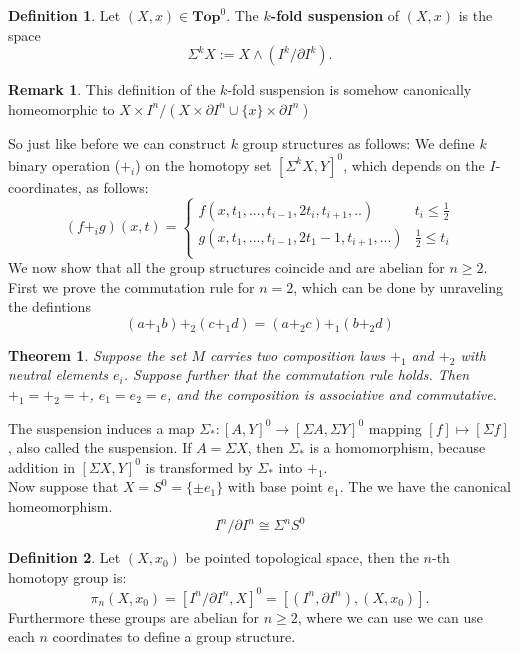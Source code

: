 \documentclass{article}
\newtheorem{theorem}{Theorem}[section]
\theoremstyle{definition}
\newtheorem{remark}{Remark}
\newtheorem{defn}{Definition}[section]
\newcommand{\cat}[1]{\mathbf{#1}}
\begin{document}
  \begin{defn}
   Let $(X,x)\in\cat{Top}^{0}$. The \textbf{$k$-fold suspension} of $(X,x)$ is the space \[\Sigma^k X:=X\wedge  (I^k/\partial I^k).\]
  \end{defn}
  \begin{remark}
  This definition of the $k$-fold suspension is somehow canonically homeomorphic to $X\times I^n/(X\times\partial I^n\cup\{x\}\times \partial I^n)$
  \end{remark}
  So just like before we can construct  $k$ group structures as follows: We define  $k$ binary operation ($+_i$) on the homotopy set $[\Sigma^k X, Y]^0$, which depends on the $I$-coordinates, as follows:$$(f+_i g)(x,t)= \begin{cases} 
      f(x,t_1, ..., t_{i-1},2t_i, t_{i+1},..) & t_i\leq \frac{1}{2} \\
      g(x,t_1, ..., t_{i-1},2t_1-1, t_{i+1},...) & \frac{1}{2}\leq t_i \\
   \end{cases}$$
   We now show that all the group structures coincide and are abelian for $n\geq 2$. First we prove the commutation rule for $n=2$, which can be done by unraveling the defintions $$(a+_1 b)+_2(c+_1 d)=(a+_2 c)+_1(b+_2d)$$
   \begin{theorem}
   Suppose the set $M$ carries two composition laws $+_1$ and $+_2$ with neutral elements $e_i$. Suppose further that the commutation rule holds. Then $+_1=+_2=+$, $e_1=e_2=e$, and the composition is associative and commutative. 
   \end{theorem}
   The suspension induces a map $\Sigma_*:[A,Y]^0 \rightarrow [\Sigma A,\Sigma Y]^0$ mapping $[f]\mapsto [\Sigma f]$, also called the suspension. If $A=\Sigma X$, then $\Sigma _*$ is a homomorphism, because addition in $[\Sigma X, Y]^0$ is transformed by $\Sigma_*$ into $+_1$. \\ Now suppose that $X=S^{0}=\{\pm e_1\}$ with base point $e_1$. The we have the canonical homeomorphism. $$I^{n}/\partial I^{n}\cong \Sigma^n S^0$$
   \begin{defn}
   Let $(X,x_0)$ be pointed topological space, then the $n$-th homotopy group is: $$\pi_n(X,x_0)=[I^n/\partial I^n,X]^0=[(I^n,\partial I^n), (X,x_0)].$$ Furthermore these groups are abelian for $n\geq 2$, where we can use we can use each $n$ coordinates to define a group structure.  
   \end{defn}
\end{document}
